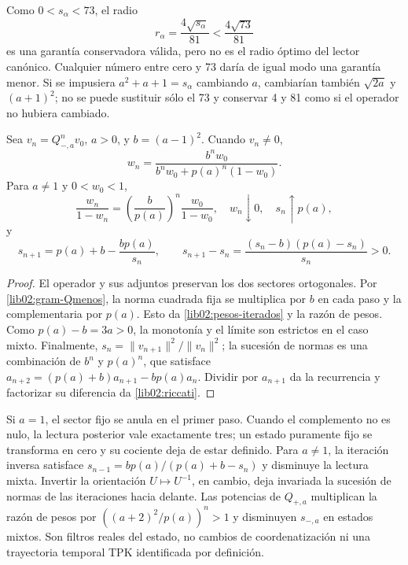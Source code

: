 Como \(0<s_\alpha<73\), el radio
\[
 r_\alpha=\frac{4\sqrt{s_\alpha}}{81}<\frac{4\sqrt{73}}{81}
\]
es una garantía conservadora válida, pero no es el radio óptimo del
lector canónico. Cualquier número entre cero y 73 daría de igual modo
una garantía menor. Si se impusiera \(a^2+a+1=s_\alpha\) cambiando
\(a\), cambiarían también \(\sqrt{2a}\) y \((a+1)^2\); no se
puede sustituir sólo el 73 y conservar 4 y 81 como si el operador no
hubiera cambiado.

\begin{theorem}
\label{lib02:iteraciones}
Sea \(v_n=Q_{-,a}^nv_0\), \(a>0\), y
\(b=(a-1)^2\). Cuando \(v_n\ne0\),
\begin{equation}
 w_n=\frac{b^nw_0}{b^nw_0+p(a)^n(1-w_0)}.
 \label{lib02:pesos-iterados}
\end{equation}
Para \(a\ne1\) y \(0<w_0<1\),
\[
 \frac{w_n}{1-w_n}
 =\left(\frac b{p(a)}\right)^n\frac{w_0}{1-w_0},
 \quad w_n\downarrow0,\quad s_n\uparrow p(a),
\]
y
\begin{equation}
 s_{n+1}=p(a)+b-\frac{bp(a)}{s_n},\qquad
 s_{n+1}-s_n=\frac{(s_n-b)(p(a)-s_n)}{s_n}>0.
 \label{lib02:riccati}
\end{equation}
\end{theorem}
\begin{proof}
El operador y sus adjuntos preservan los dos sectores ortogonales. Por
\eqref{lib02:gram-Qmenos}, la norma cuadrada fija se multiplica por
\(b\) en cada paso y la complementaria por \(p(a)\). Esto da
\eqref{lib02:pesos-iterados} y la razón de pesos. Como
\(p(a)-b=3a>0\), la monotonía y el límite son estrictos en el caso
mixto. Finalmente,
\(s_n=\|v_{n+1}\|^2/\|v_n\|^2\); la sucesión de normas es
una combinación de \(b^n\) y \(p(a)^n\), que satisface
\(a_{n+2}=(p(a)+b)a_{n+1}-bp(a)a_n\). Dividir por
\(a_{n+1}\) da la recurrencia y factorizar su diferencia da
\eqref{lib02:riccati}.
\end{proof}

Si \(a=1\), el sector fijo se anula en el primer paso. Cuando el
complemento no es nulo, la lectura posterior vale exactamente tres;
un estado puramente fijo se transforma en cero y su cociente deja de
estar definido. Para \(a\ne1\), la iteración inversa satisface
\(s_{n-1}=bp(a)/(p(a)+b-s_n)\) y disminuye la lectura mixta.
Invertir la orientación \(U\mapsto U^{-1}\), en cambio, deja
invariada la sucesión de normas de las iteraciones hacia delante.
Las potencias de \(Q_{+,a}\) multiplican la razón de pesos por
\(((a+2)^2/p(a))^n>1\) y disminuyen \(s_{-,a}\) en estados
mixtos. Son filtros reales del estado, no cambios de coordenatización ni una
trayectoria temporal TPK identificada por definición.

